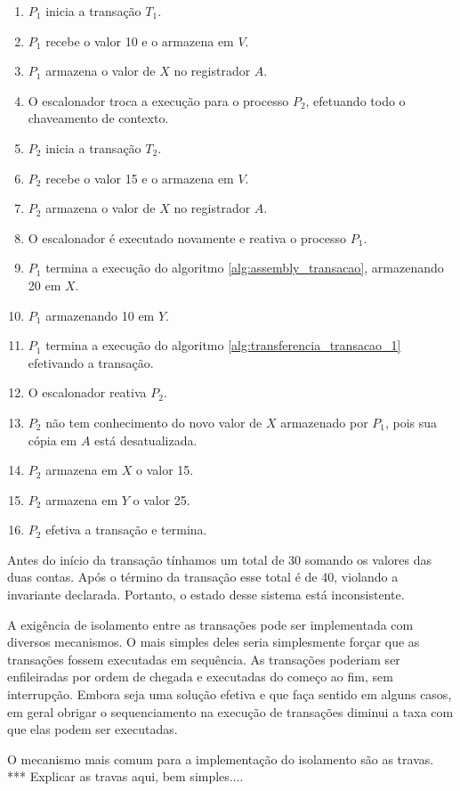 \documentclass[11pt,twoside,a4paper]{book}
\begin{document}
\begin{enumerate}
	\item $P_1$ inicia a transação $T_1$.
	\item $P_1$ recebe o valor 10 e o armazena em $V$.
	\item $P_1$ armazena o valor de $X$ no registrador $A$.
	\item O escalonador troca a execução para o processo $P_2$, efetuando todo o chaveamento de contexto.
	\item $P_2$ inicia a transação $T_2$.
	\item $P_2$ recebe o valor 15 e o armazena em $V$.
	\item $P_2$ armazena o valor de $X$ no registrador $A$.
	\item O escalonador é executado novamente e reativa o processo $P_1$.
	\item $P_1$ termina a execução do algoritmo \ref{alg:assembly_transacao}, armazenando 20 em $X$.
	\item $P_1$ armazenando 10 em $Y$.
	\item $P_1$ termina a execução do algoritmo \ref{alg:transferencia_transacao_1} efetivando a transação.
	\item O escalonador reativa $P_2$.
	\item $P_2$ não tem conhecimento do novo valor de $X$ armazenado por $P_1$, pois sua cópia em $A$ está desatualizada.
	\item $P_2$ armazena em $X$ o valor 15.
	\item $P_2$ armazena em $Y$ o valor 25.
	\item $P_2$ efetiva a transação e termina.
\end{enumerate}

Antes do início da transação tínhamos um total de 30 somando os valores das duas contas. Após o término da transação esse total é de 40, violando a invariante declarada. Portanto, o estado desse sistema está inconsistente.

A exigência de isolamento entre as transações pode ser implementada com diversos mecanismos. O mais simples deles seria simplesmente forçar que as transações fossem executadas em sequência. As transações poderiam ser enfileiradas por ordem de chegada e executadas do começo ao fim, sem interrupção. Embora seja uma solução efetiva e que faça sentido em alguns casos, em geral obrigar o sequenciamento na execução de transações diminui a taxa com que elas podem ser executadas.

O mecanismo mais comum para a implementação do isolamento são as travas. *** Explicar as travas aqui, bem simples....
\end{document}
